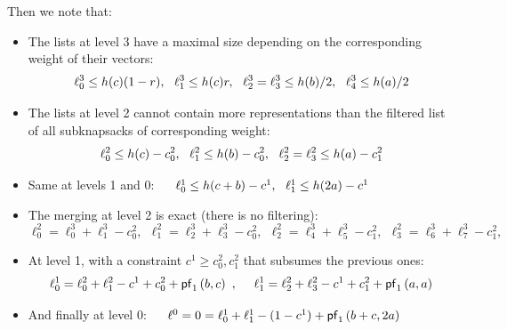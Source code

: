 Then we note that:
\begin{itemize}
\item The lists at level 3 have a maximal size depending on the corresponding weight of their vectors:
$$ \ell_0^3 \leq h(c) (1-r),~~ \ell_1^3 \leq h(c) r,~~ \ell_2^3 = \ell_3^3 \leq h(b)/2,~~ \ell_4^3 \leq h(a)/2 $$
\item The lists at level 2 cannot contain more representations than the filtered list of all subknapsacks of corresponding weight:
$$ \ell_0^2 \leq h(c) - c_0^2,~~ \ell_1^2 \leq h(b) - c_0^2,~~ \ell_2^2 = \ell_3^2 \leq h(a) - c_1^2 $$
\item Same at levels 1 and 0: ~~ $ \ell_0^1 \leq h(c + b) - c^1,~~ \ell_1^1 \leq h(2a) - c^1 $
\item The merging at level 2 is exact (there is no filtering):
$$ \ell_0^2 = \ell_0^3 + \ell_1^3 - c_0^2,~~ \ell_1^2 = \ell_2^3 + \ell_3^3 - c_0^2,~~ \ell_2^2 = \ell_4^3 + \ell_5^3 - c_1^2, ~~\ell_3^2 = \ell_6^3 + \ell_7^3 - c_1^2, $$
\item At level 1, with a constraint $c^1 \geq c_0^2, c_1^2$ that subsumes the previous ones:
$$ \ell_0^1 = \ell_0^2 + \ell_1^2 - c^1 + c_0^2 + \mathsf{pf}_1 \left(b, c \right)~,~~~~ \ell_1^1 = \ell_2^2 + \ell_3^2 - c^1 + c_1^2 + \mathsf{pf}_1 \left(a, a \right)$$
\item And finally at level 0: ~~ $ \ell^0 = 0 = \ell_0^1 + \ell_1^1 - (1-c^1) + \mathsf{pf}_1 \left(b +c, 2a \right) $
\end{itemize}

